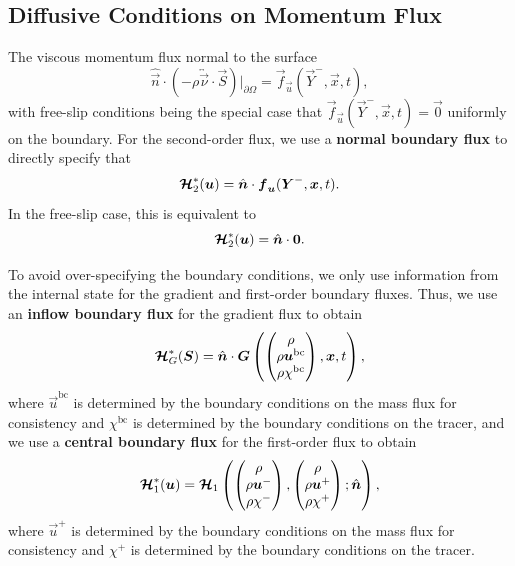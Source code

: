 \documentclass{report}
\numberwithin{equation}{section}
\begin{document}
\subsection{Diffusive Conditions on Momentum Flux}

The viscous momentum flux normal to the surface
\begin{equation}
    \hat{\vec n } \cdot \left( - \rho \overleftrightarrow{\vec{\nu}} \cdot  \vec S \right)\bigg|_{\partial \Omega} = \vec f_{\vec u}(\vec Y^-, \vec x, t),
\end{equation}
with free-slip conditions being the special case that $\vec f_{\vec u}(\vec Y^-, \vec x, t) = \vec 0$ uniformly on the boundary. 
For the second-order flux, we use a \textbf{normal boundary flux} to directly specify that
\begin{equation}
    \boldsymbol{{\mathcal{H}}}_2^*(\boldsymbol{{u}}) = \hat{\boldsymbol{{n}} } \cdot \boldsymbol{{f}}_{\boldsymbol{{u}}}(\boldsymbol{{Y}}^-, \boldsymbol{{x}}, t).
\end{equation}
In the free-slip case, this is equivalent to
\begin{equation}
    \boldsymbol{{\mathcal{H}}}_2^*(\boldsymbol{{u}}) = \hat{\boldsymbol{{n}} } \cdot \boldsymbol{{0}}.
\end{equation} 

To avoid over-specifying the boundary conditions, we only use information from the internal state for the gradient and first-order boundary fluxes. Thus, we use an \textbf{inflow boundary flux} for the gradient flux to obtain
\begin{equation}
    \boldsymbol{{\mathcal{H}}}_G^*(\boldsymbol{{S}}) = \hat{\boldsymbol{{n}} } \cdot \boldsymbol{{G}} \left(\begin{pmatrix} \rho \\ \rho \boldsymbol{{u}}^{\text{bc}} \\ \rho \chi^{\text{bc}} \end{pmatrix} , \boldsymbol{{x}}, t \right),
\end{equation}
where $\vec u^{\text{bc}}$ is determined by the boundary conditions on the mass flux for consistency and $\chi^{\text{bc}}$ is determined by the boundary conditions on the tracer, and we use a \textbf{central boundary flux} for the first-order flux to obtain
\begin{equation}
    \boldsymbol{{\mathcal{H}}}_1^*(\boldsymbol{{u}}) = \boldsymbol{{\mathcal{H}}}_1 \left(
        \begin{pmatrix} \rho \\ \rho \boldsymbol{{u}}^- \\ \rho \chi^- \end{pmatrix}, 
        \begin{pmatrix} \rho \\ \rho \boldsymbol{{u}}^+ \\ \rho \chi^+ \end{pmatrix}; 
        \hat{\boldsymbol{{n}} }
    \right),
\end{equation}
where $\vec u^+$ is determined by the boundary conditions on the mass flux for consistency and $\chi^+$ is determined by the boundary conditions on the tracer.
\end{document}

